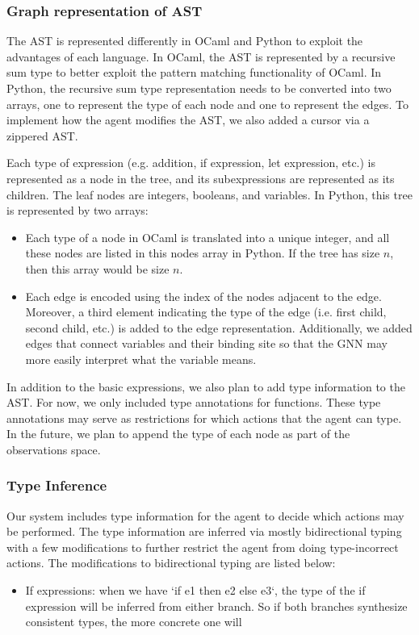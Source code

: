 \documentclass{article}
\begin{document}
\subsubsection{Graph representation of AST}
\hspace{16}The AST is represented differently in OCaml and Python to exploit the advantages of each language. In OCaml, the AST is represented by a recursive sum type to better exploit the pattern matching functionality of OCaml. In Python, the recursive sum type representation needs to be converted into two arrays, one to represent the type of each node and one to represent the edges. To implement how the agent modifies the AST, we also added a cursor via a zippered AST. 

\hspace{16}Each type of expression (e.g. addition, if expression, let expression, etc.) is represented as a node in the tree, and its subexpressions are represented as its children. The leaf nodes are integers, booleans, and variables. In Python, this tree is represented by two arrays:
\begin{itemize}
    \item Each type of a node in OCaml is translated into a unique integer, and all these nodes are listed in this nodes array in Python. If the tree has size $n$, then this array would be size $n$. 
    \item Each edge is encoded using the index of the nodes adjacent to the edge. Moreover, a third element indicating the type of the edge (i.e. first child, second child, etc.) is added to the edge representation. Additionally, we added edges that connect variables and their binding site so that the GNN may more easily interpret what the variable means.
\end{itemize}

\hspace{16}In addition to the basic expressions, we also plan to add type information to the AST. For now, we only included type annotations for functions. These type annotations may serve as restrictions for which actions that the agent can type. In the future, we plan to append the type of each node as part of the observations space. 

\subsubsection{Type Inference}
\hspace{16}Our system includes type information for the agent to decide which actions may be performed. The type information are inferred via mostly bidirectional typing with a few modifications to further restrict the agent from doing type-incorrect actions. The modifications to bidirectional typing are listed below:
\begin{itemize}
    \item If expressions: when we have `if e1 then e2 else e3`, the type of the if expression will be inferred from either branch. So if both branches synthesize consistent types, the more concrete one will 
\end{itemize}
\end{document}
